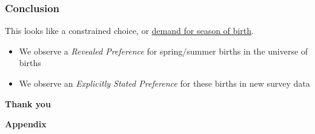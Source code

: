 \documentclass[10pt,letterpaper,subeqn]{beamer}
\begin{document}

\begin{frame}[label=conclusions2]
\frametitle{Conclusion}
This looks like a constrained choice, or \underline{demand for season of birth}.
\vspace{3mm} \\
\begin{itemize}
\item We observe a \emph{Revealed Preference} for spring/summer births in the universe of births
\item We observe an \emph{Explicitly Stated Preference} for these births in new survey data
\end{itemize}
\end{frame}


\begin{frame}
  \begin{center}
    \textbf{Thank you}
  \end{center}
\end{frame}


\begin{frame}
\begin{center}
    \textbf{Appendix}
\end{center}
\end{frame}
\end{document}
